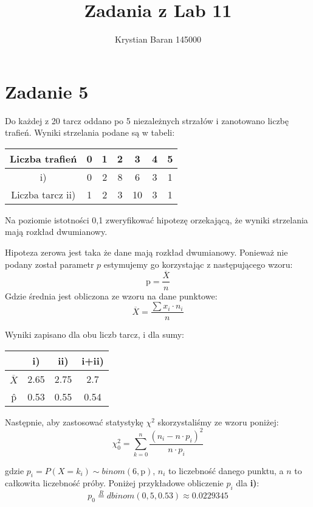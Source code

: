 \documentclass{article}
\author{Krystian Baran 145000}
\title{Zadania z Lab 11}
\begin{document}
\maketitle
\newpage

\tableofcontents
\newpage

\section{Zadanie 5}
Do każdej z 20 tarcz oddano po 5 niezależnych strzałów i zanotowano liczbę trafień. Wyniki strzelania podane są w tabeli:
\begin{center} \begin{tabular}{|c|c|c|c|c|c|c|} \hline
Liczba trafień & 0 & 1 & 2 & 3 & 4 & 5 \\ \hline
i) & 0 & 2 & 8 & 6 & 3 & 1 \\ \cline{2-7}
Liczba tarcz ii) & 1 & 2 & 3 & 10 & 3 & 1 \\ \hline
\end{tabular} \end{center}
Na poziomie istotności 0,1 zweryfikować hipotezę orzekającą, że wyniki strzelania mają rozkład dwumianowy. \\ \par

Hipoteza zerowa jest taka że dane mają rozkład dwumianowy. Ponieważ nie podany został parametr $p$ estymujemy go korzystając z następującego wzoru:
\[ \text{\^p} = \frac{\overline{X}}{n} \]
Gdzie średnia jest obliczona ze wzoru na dane punktowe:
\[ \overline{X} = \frac{\sum x_i \cdot n_i}{n} \]

Wyniki zapisano dla obu liczb tarcz, i dla sumy:
\begin{center} \begin{tabular}{|c|c|c|c|} \hline
 & i) & ii) & i+ii) \\ \hline
$\overline{X}$ & 2.65	& 2.75 & 2.7 \\ \hline
\^p & 0.53 & 0.55 & 0.54 \\ \hline
\end{tabular} \end{center}

Następnie, aby zastosować statystykę $\chi^2$ skorzystaliśmy ze wzoru poniżej:
\[ \chi^2_0 = \sum_{k=0}^n \frac{(n_i - n \cdot p_i)^2}{n \cdot p_i} \]

gdzie $p_i = P(X = k_i) \sim binom(6, \text{\^p})$, $n_i$ to liczebność danego punktu, a $n$ to całkowita liczebność próby. Poniżej przykładowe obliczenie $p_i$ dla \textbf{i)}:
\[ p_0 \overset{R}{=} dbinom(0, 5, 0.53) \approx 0.0229345 \]
\end{document}
